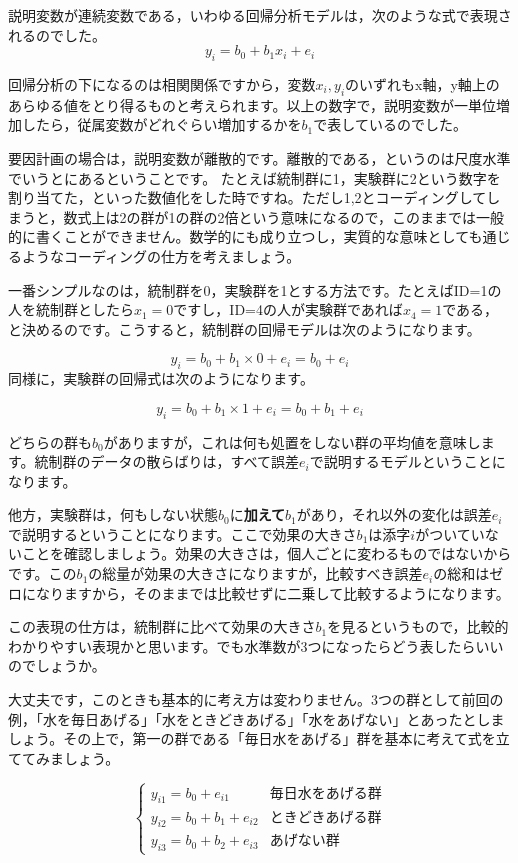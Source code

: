 \documentclass{ltjbook}
\begin{document}
説明変数が連続変数である，いわゆる回帰分析モデルは，次のような式で表現されるのでした。
\[ y_i = b_0 + b_1 x_i + e_i \]

回帰分析の下になるのは相関関係ですから，変数$x_i,y_i$のいずれもx軸，y軸上のあらゆる値をとり得るものと考えられます。以上の数字で，説明変数が一単位増加したら，従属変数がどれぐらい増加するかを$b_1$で表しているのでした。

要因計画の場合は，説明変数が離散的です。離散的である，というのは尺度水準でいうとにあるということです。
たとえば統制群に1，実験群に2という数字を割り当てた，といった数値化をした時ですね。ただし1,2とコーディングしてしまうと，数式上は2の群が1の群の2倍という意味になるので，このままでは一般的に書くことができません。数学的にも成り立つし，実質的な意味としても通じるようなコーディングの仕方を考えましょう。

一番シンプルなのは，統制群を0，実験群を1とする方法です。たとえばID=1の人を統制群としたら$x_1=0$ですし，ID=4の人が実験群であれば$x_4=1$である，と決めるのです。こうすると，統制群の回帰モデルは次のようになります。

\[ y_i = b_0 + b_1 \times 0 + e_i = b_0 + e_i \]
同様に，実験群の回帰式は次のようになります。

\[ y_i = b_0 + b_1 \times 1 + e_i = b_0 + b_1 + e_i \]

どちらの群も$b_0$がありますが，これは何も処置をしない群の平均値を意味します。統制群のデータの散らばりは，すべて誤差$e_i$で説明するモデルということになります。

他方，実験群は，何もしない状態$b_0$に\textbf{加えて}$b_1$があり，それ以外の変化は誤差$e_i$で説明するということになります。ここで効果の大きさ$b_1$は添字$i$がついていないことを確認しましょう。効果の大きさは，個人ごとに変わるものではないからです。この$b_1$の総量が効果の大きさになりますが，比較すべき誤差$e_i$の総和はゼロになりますから，そのままでは比較せずに二乗して比較するようになります。

この表現の仕方は，統制群に比べて効果の大きさ$b_1$を見るというもので，比較的わかりやすい表現かと思います。でも水準数が3つになったらどう表したらいいのでしょうか。

大丈夫です，このときも基本的に考え方は変わりません。3つの群として前回の例，「水を毎日あげる」「水をときどきあげる」「水をあげない」とあったとしましょう。その上で，第一の群である「毎日水をあげる」群を基本に考えて式を立ててみましょう。

\[
	\begin{cases}
		y_{i1} = b_0 + e_{i1}       & \mbox{毎日水をあげる群} \\
		y_{i2} = b_0 + b_1 + e_{i2} & \mbox{ときどきあげる群} \\
		y_{i3} = b_0 + b_2 + e_{i3} & \mbox{あげない群}
	\end{cases}
\]
\end{document}
